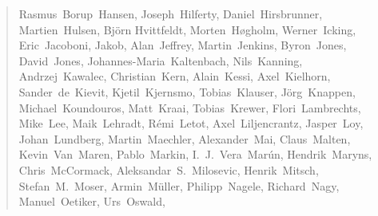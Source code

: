 \begin{quote}
Rasmus~Borup~Hansen,    %
Joseph~Hilferty,        %
Daniel~Hirsbrunner,     %
Martien~Hulsen,         %
Bj\"orn Hvittfeldt,     %
Morten~H\o gholm,       %
Werner~Icking,          %
Eric~Jacoboni,          %
Jakob,                  %
Alan~Jeffrey,           %
Martin~Jenkins,         %
Byron~Jones,            %
David~Jones,            %
Johannes-Maria~Kaltenbach, %
Nils~Kanning,           %
Andrzej~Kawalec,        %
Christian~Kern,         %
Alain~Kessi,            %
Axel~Kielhorn,          %
Sander~de~Kievit,       %
Kjetil~Kjernsmo,        %
Tobias~Klauser,		%
J\"org~Knappen,         %
Michael~Koundouros,     %
Matt~Kraai,             %
Tobias~Krewer,          %
Flori~Lambrechts,       %
Mike~Lee,               %
Maik~Lehradt,           %
R\'emi~Letot,           %
Axel~Liljencrantz,	%
Jasper~Loy,             %
Johan~Lundberg,         %
Martin~Maechler,        %
Alexander~Mai,          %
Claus~Malten,           %
Kevin~Van~Maren,        %
Pablo~Markin,
I.~J.~Vera~Mar\'un,     %
Hendrik~Maryns,         %
Chris~McCormack,        %
Aleksandar~S.~Milosevic, %
Henrik~Mitsch,          %
Stefan~M.~Moser,        %
Armin~M\"uller,		%
Philipp~Nagele,         %
Richard~Nagy,           %
Manuel~Oetiker,         %
Urs~Oswald,             %

\end{quote}
